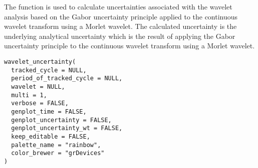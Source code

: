 \documentclass[a4paper]{book}
\begin{document}
%
\begin{Description}
The  function is used to calculate uncertainties associated
with the wavelet analysis based on the Gabor uncertainty principle applied to the
continuous wavelet transform using a Morlet wavelet. The calculated uncertainty is the underlying
analytical uncertainty which is the result of applying the Gabor uncertainty principle to the
continuous wavelet transform using a Morlet wavelet.
\end{Description}
%
\begin{Usage}
\begin{verbatim}
wavelet_uncertainty(
  tracked_cycle = NULL,
  period_of_tracked_cycle = NULL,
  wavelet = NULL,
  multi = 1,
  verbose = FALSE,
  genplot_time = FALSE,
  genplot_uncertainty = FALSE,
  genplot_uncertainty_wt = FALSE,
  keep_editable = FALSE,
  palette_name = "rainbow",
  color_brewer = "grDevices"
)
\end{verbatim}
\end{Usage}
%
\end{document}
